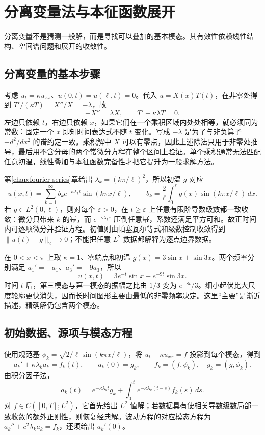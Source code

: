 \setcounter{chapter}{5} %
\chapter{分离变量法与本征函数展开}
\label{chap:separation}

分离变量不是猜测一般解，而是寻找可以叠加的基本模态。其有效性依赖线性结构、空间谱问题和展开的收敛性。

\section{分离变量的基本步骤}
考虑 $u_t=\kappa u_{xx}$、$u(0,t)=u(\ell,t)=0$。代入 $u=X(x)T(t)$，在非零处得到 $T'/(\kappa T)=X''/X=-\lambda$，故
\[
 -X''=\lambda X,\qquad T'+\kappa\lambda T=0.
\]
左边只依赖 $t$，右边只依赖 $x$，如果它们在一个乘积区域内处处相等，就必须同为常数：固定一个 $x$ 即知时间表达式不随 $t$ 变化。写成 $-\lambda$ 是为了与非负算子 $-d^2/dx^2$ 的谱约定一致。乘积解中 $X$ 可以有零点，因此上述除法只用于非零处推导，最后用不含分母的两个常微分方程在整个区间上验证。单个乘积通常无法匹配任意初温，线性叠加与本征函数完备性才把它提升为一般求解方法。

第\ref{chap:fourier-series}章给出 $\lambda_k=(k\pi/\ell)^2$，所以初温 $g$ 对应
\begin{equation}
 u(x,t)=\sum_{k=1}^\infty b_k e^{-\kappa\lambda_kt}\sin(k\pi x/\ell),
 \qquad b_k=\frac2\ell\int_0^\ell g(x)\sin(k\pi x/\ell)\,dx.
 \label{eq:heat-sine-solution}
\end{equation}
若 $g\in L^2(0,\ell)$，则对每个 $\varepsilon>0$，在 $t\ge\varepsilon$ 上任意有限阶导数级数都一致收敛：微分只带来 $k$ 的幂，而 $e^{-\kappa\lambda_k\varepsilon}$ 压倒任意幂，系数还满足平方可和。故正时间内可逐项微分并验证方程。初值则由帕塞瓦尔等式和级数控制收敛得到 $\|u(t)-g\|_2\to0$；不能把任意 $L^2$ 数据都解释为逐点边界数据。

\begin{example}[两种空间尺度的消退]
在 $0<x<\pi$ 上取 $\kappa=1$、零端点和初温 $g(x)=3\sin x+\sin3x$。两个频率分别满足 $a_1'=-a_1$、$a_3'=-9a_3$，所以
\[
 u(x,t)=3e^{-t}\sin x+e^{-9t}\sin3x.
\]
时间 $t$ 后，第三模态与第一模态的振幅之比由 $1/3$ 变为 $e^{-8t}/3$。细小起伏比大尺度轮廓更快消失，因而长时间图形主要由最低的非零频率决定。这里“主要”是渐近描述，精确解仍包含两个模态。
\end{example}

\section{初始数据、源项与模态方程}
使用规范基 $\phi_k=\sqrt{2/\ell}\sin(k\pi x/\ell)$，将 $u_t-\kappa u_{xx}=f$ 投影到每个模态，得到
\[
 a_k'+\kappa\lambda_k a_k=f_k(t),\qquad a_k(0)=g_k,
 \qquad f_k=(f,\phi_k),\quad g_k=(g,\phi_k).
\]
由积分因子法，
\begin{equation}
 a_k(t)=e^{-\kappa\lambda_kt}g_k+
 \int_0^t e^{-\kappa\lambda_k(t-s)}f_k(s)\,ds.
 \label{eq:heat-mode-forcing}
\end{equation}
对 $f\in C([0,T];L^2)$，它首先给出 $L^2$ 值解；若数据具有使相关导数级数局部一致收敛的额外正则性，则恢复经典解。波动方程的对应模态方程为 $a_k''+c^2\lambda_k a_k=f_k$，还须给出 $a_k'(0)$。


